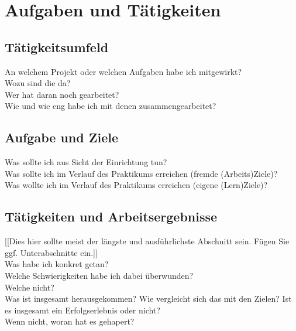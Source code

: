 \section{Aufgaben und Tätigkeiten}

\subsection{Tätigkeitsumfeld}
An welchem Projekt oder welchen Aufgaben habe ich mitgewirkt?~\cite{siemens2004lebenserinnerungen}\\
Wozu sind die da?\\
Wer hat daran noch gearbeitet?\\
Wie und wie eng habe ich mit denen zusammengearbeitet?\\

\subsection{Aufgabe und Ziele}
Was sollte ich aus Sicht der Einrichtung tun?\\
Was sollte ich im Verlauf des Praktikums erreichen (fremde (Arbeits)Ziele)?\\
Was wollte ich im Verlauf des Praktikums erreichen (eigene (Lern)Ziele)?\\

\subsection{Tätigkeiten und Arbeitsergebnisse}
[[Dies hier sollte meist der längste und ausführlichste Abschnitt sein. Fügen Sie ggf.
Unterabschnitte ein.]]\\
Was habe ich konkret getan?\\
Welche Schwierigkeiten habe ich dabei überwunden?\\
Welche nicht?\\
Was ist insgesamt herausgekommen?
Wie vergleicht sich das mit den Zielen? Ist es insgesamt ein Erfolgserlebnis oder nicht?\\
Wenn nicht, woran hat es gehapert?\\
